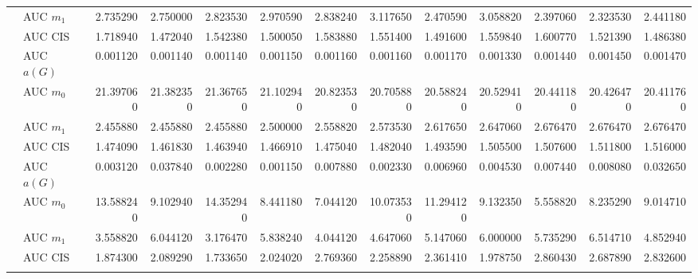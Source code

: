 \begin{table}[htbp]
\begin{tabular}{llrrrrrrrrrrr}
    & AUC $m_1$ & 2.735290 & 2.750000 & 2.823530 & 2.970590 & 2.838240 & 3.117650 & 2.470590 & 3.058820 & 2.397060 & 2.323530 & 2.441180 \\
    & AUC CIS & 1.718940 & 1.472040 & 1.542380 & 1.500050 & 1.583880 & 1.551400 & 1.491600 & 1.559840 & 1.600770 & 1.521390 & 1.486380 \\
    \addlinespace
    \multirow{4}{*}{degree} & AUC $a(G)$ & 0.001120 & 0.001140 & 0.001140 & 0.001150 & 0.001160 & 0.001160 & 0.001170 & 0.001330 & 0.001440 & 0.001450 & 0.001470 \\
    & AUC $m_0$ & 21.397060 & 21.382350 & 21.367650 & 21.102940 & 20.823530 & 20.705880 & 20.588240 & 20.529410 & 20.441180 & 20.426470 & 20.411760 \\
    & AUC $m_1$ & 2.455880 & 2.455880 & 2.455880 & 2.500000 & 2.558820 & 2.573530 & 2.617650 & 2.647060 & 2.676470 & 2.676470 & 2.676470 \\
    & AUC CIS & 1.474090 & 1.461830 & 1.463940 & 1.466910 & 1.475040 & 1.482040 & 1.493590 & 1.505500 & 1.507600 & 1.511800 & 1.516000 \\
    \addlinespace
    \multirow{4}{*}{random} & AUC $a(G)$ & 0.003120 & 0.037840 & 0.002280 & 0.001150 & 0.007880 & 0.002330 & 0.006960 & 0.004530 & 0.007440 & 0.008080 & 0.032650 \\
    & AUC $m_0$ & 13.588240 & 9.102940 & 14.352940 & 8.441180 & 7.044120 & 10.073530 & 11.294120 & 9.132350 & 5.558820 & 8.235290 & 9.014710 \\
    & AUC $m_1$ & 3.558820 & 6.044120 & 3.176470 & 5.838240 & 4.044120 & 4.647060 & 5.147060 & 6.000000 & 5.735290 & 6.514710 & 4.852940 \\
    & AUC CIS & 1.874300 & 2.089290 & 1.733650 & 2.024020 & 2.769360 & 2.258890 & 2.361410 & 1.978750 & 2.860430 & 2.687890 & 2.832600 \\
    \addlinespace
    \bottomrule
  \end{tabular}
\end{table}

